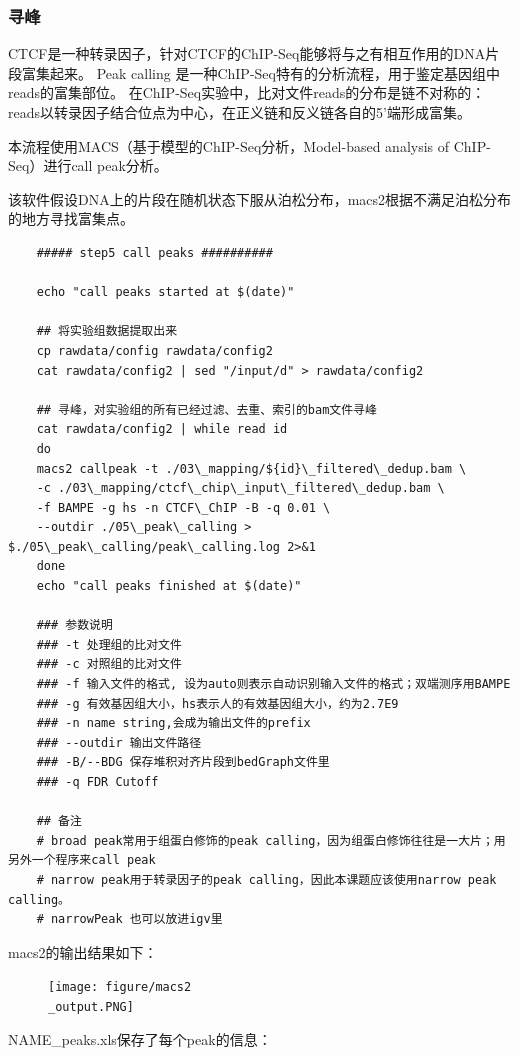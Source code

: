 \subsubsection{寻峰}
CTCF是一种转录因子，针对CTCF的ChIP-Seq能够将与之有相互作用的DNA片段富集起来。 Peak calling 是一种ChIP-Seq特有的分析流程，用于鉴定基因组中reads的富集部位。
在ChIP-Seq实验中，比对文件reads的分布是链不对称的：reads以转录因子结合位点为中心，在正义链和反义链各自的5’端形成富集。\par
本流程使用MACS（基于模型的ChIP-Seq分析，Model-based analysis of ChIP-Seq）进行call peak分析。\par
该软件假设DNA上的片段在随机状态下服从泊松分布，macs2根据不满足泊松分布的地方寻找富集点。


\begin{lstlisting}
    ##### step5 call peaks ##########

    echo "call peaks started at $(date)"

    ## 将实验组数据提取出来
    cp rawdata/config rawdata/config2
    cat rawdata/config2 | sed "/input/d" > rawdata/config2

    ## 寻峰，对实验组的所有已经过滤、去重、索引的bam文件寻峰
    cat rawdata/config2 | while read id
    do
    macs2 callpeak -t ./03\_mapping/${id}\_filtered\_dedup.bam \
    -c ./03\_mapping/ctcf\_chip\_input\_filtered\_dedup.bam \
    -f BAMPE -g hs -n CTCF\_ChIP -B -q 0.01 \
    --outdir ./05\_peak\_calling > $./05\_peak\_calling/peak\_calling.log 2>&1
    done
    echo "call peaks finished at $(date)"

    ### 参数说明
    ### -t 处理组的比对文件
    ### -c 对照组的比对文件
    ### -f 输入文件的格式, 设为auto则表示自动识别输入文件的格式；双端测序用BAMPE
    ### -g 有效基因组大小，hs表示人的有效基因组大小，约为2.7E9
    ### -n name string,会成为输出文件的prefix
    ### --outdir 输出文件路径
    ### -B/--BDG 保存堆积对齐片段到bedGraph文件里
    ### -q FDR Cutoff

    ## 备注
    # broad peak常用于组蛋白修饰的peak calling，因为组蛋白修饰往往是一大片；用另外一个程序来call peak
    # narrow peak用于转录因子的peak calling，因此本课题应该使用narrow peak calling。
    # narrowPeak 也可以放进igv里
\end{lstlisting}
macs2的输出结果如下：
\begin{figure}[ht]
    \centering
    \texttt{[image: figure/macs2\\\_output.PNG]}
\end{figure}

NAME\_peaks.xls保存了每个peak的信息：

